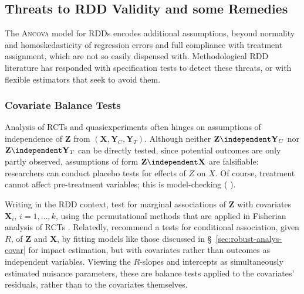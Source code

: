 \subsection{Threats to RDD Validity and some Remedies}\label{sec:specification}

The \textsc{Ancova} model for RDDs encodes additional assumptions,
beyond normality and homoskedasticity of regression errors and full
compliance with treatment assignment, which are not so easily
dispensed with.
Methodological RDD literature has responded with specification tests
to detect these threats, or with flexible estimators that
seek to avoid them.

\subsubsection{Covariate Balance Tests}\label{sec:balanceTesting}
Analysis of RCTs and quasiexperiments often hinges on assumptions of
independence of
 $\mathbf{Z}$ from $(\mathbf{X}, \mathbf{Y}_{C}, \mathbf{Y}_{T})$.
 Although neither $\mathbf{Z} \independent \mathbf{Y}_{C}$ nor
 $\mathbf{Z} \independent \mathbf{Y}_{T}$ can be directly tested,
 since potential outcomes are only partly observed, assumptions of form
 $\mathbf{Z} \independent \mathbf{X}$ are falsifiable: researchers can
 conduct placebo tests for effects of $Z$ on $X$.
Of course, treatment cannot affect pre-treatment variables; this is
model-checking (%
\citealp[][\S~5.13]{cox2006pos}%
).  %

 Writing in the RDD context, \citet{cattaneo2014randomization} test
 for marginal associations of $\mathbf{Z}$ with covariates $\mathbf{X}_{i}$,
 $i=1, \ldots, k$, using the permutational methods that are applied
 in Fisherian analysis of RCTs \citep[also see][]{liMatteiMealli2015BayesianRD}.
Relatedly, \citet{lee2010regression} recommend a
 tests for conditional association, given $R$, of $\mathbf{Z}$ and
 $\mathbf{X}$, by fitting models like those discussed in
 \S~\ref{sec:robust-analys-covar} for impact estimation, but with
 covariates rather than outcomes as independent variables.
Viewing the $R$-slopes and intercepts as simultaneously estimated
 nuisance parameters, these are balance tests applied to
 the covariates' residuals, %
rather than to the covariates themselves.

